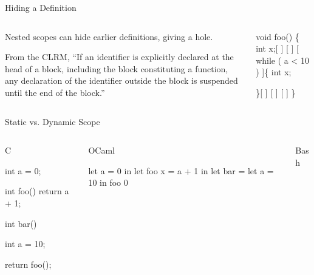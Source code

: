\documentclass{plt}
\begin{document}
\begin{frame}[fragile]{Hiding a Definition}

  \begin{columns}
    \begin{column}{0.5\textwidth}
\parskip=1pc
Nested scopes can hide earlier definitions, giving a hole.

From the CLRM, ``If an identifier is explicitly declared at the head
of a block, including the block constituting a function, any
declaration of the identifier outside the block is suspended until the
end of the block.''
    \end{column}
    \begin{column}{0.5\textwidth}
\begin{showscope}
void foo()
\{
  int x;[                  ]
[                          ]
[  while ( a < 10 ) ]\{      
    int x;

  \}[                       ]
[                          ]
[                          ]
\}%
\end{showscope}
    \end{column}
  \end{columns}
\end{frame}

\begin{frame}[fragile]{Static vs. Dynamic Scope}

\begin{columns}[t]
\begin{column}{0.3\textwidth}
\centerline{C}

\vspace{0.5\baselineskip}

\begin{C}
int a = 0;

int foo() {
  return a + 1;
}

int bar() {
  int a = 10;

  return foo();
}
\end{C}
\end{column}
\begin{column}{0.3\textwidth}
\centerline{OCaml}

\vspace{0.5\baselineskip}

\begin{ocaml}
let a = 0 in
let foo x = a + 1 in
let bar =
  let a = 10 in
  foo 0
\end{ocaml}
\end{column}
\begin{column}{0.3\textwidth}
\centerline{Bash}

\vspace{0.5\baselineskip}

\end{column}
\end{columns}

\end{frame}
\end{document}
